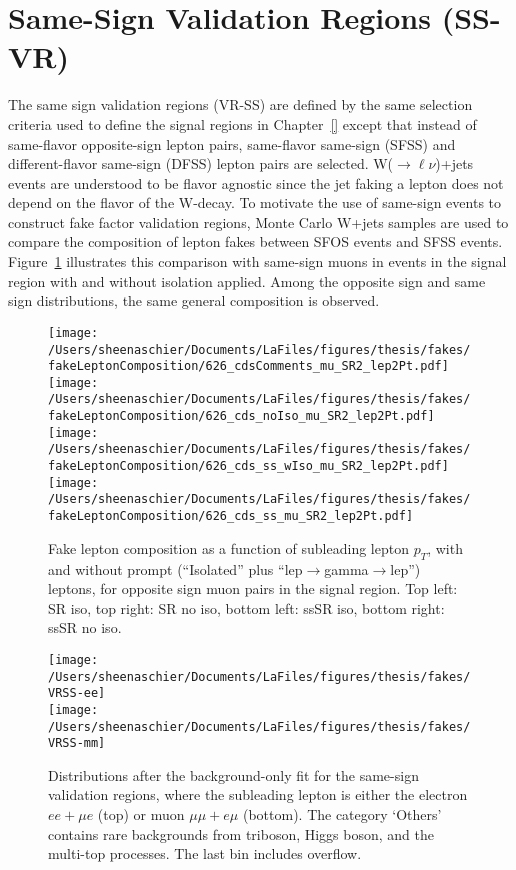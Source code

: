  \FloatBarrier

\section{Same-Sign Validation Regions (SS-VR)}
\label{sec:ssvr}
The same sign validation regions (VR-SS) are defined by the same selection criteria used to define the signal regions in Chapter~\ref{} except that instead of same-flavor opposite-sign lepton pairs, same-flavor same-sign (SFSS) and different-flavor same-sign (DFSS) lepton pairs are selected.  W($\rightarrow\ell\nu$)+jets events are understood to be flavor agnostic since the jet faking a lepton does not depend on the flavor of the W-decay.  To motivate the use of same-sign events to construct fake factor validation regions, Monte Carlo W+jets samples are used to compare the composition of lepton fakes between SFOS events and SFSS events.  Figure~\ref{fig:muMC} illustrates this comparison with same-sign muons in events in the signal region with and without isolation applied.  Among the opposite sign and same sign distributions, the same general composition is observed.  
\begin{figure}[htb]
        \centering
        \texttt{[image: /Users/sheenaschier/Documents/LaFiles/figures/thesis/fakes/fakeLeptonComposition/626\_cdsComments\_mu\_SR2\_lep2Pt.pdf]}
       \texttt{[image: /Users/sheenaschier/Documents/LaFiles/figures/thesis/fakes/fakeLeptonComposition/626\_cds\_noIso\_mu\_SR2\_lep2Pt.pdf]}
      \texttt{[image: /Users/sheenaschier/Documents/LaFiles/figures/thesis/fakes/fakeLeptonComposition/626\_cds\_ss\_wIso\_mu\_SR2\_lep2Pt.pdf]}
      \texttt{[image: /Users/sheenaschier/Documents/LaFiles/figures/thesis/fakes/fakeLeptonComposition/626\_cds\_ss\_mu\_SR2\_lep2Pt.pdf]}
        \caption{Fake lepton composition as a function of subleading lepton $p_{T}$, with and without prompt (``Isolated'' plus ``lep$\to$gamma$\to$lep'') leptons, for opposite sign muon pairs in the signal region.  Top left: SR iso, top right: SR no iso, bottom left: ssSR iso, bottom right: ssSR no iso.}
        \label{fig:muMC}
\end{figure}

\begin{figure}[htb]
        \centering
      \texttt{[image: /Users/sheenaschier/Documents/LaFiles/figures/thesis/fakes/VRSS-ee]}\\
      \texttt{[image: /Users/sheenaschier/Documents/LaFiles/figures/thesis/fakes/VRSS-mm]}
        \caption{Distributions after the background-only fit for the same-sign validation regions, where the subleading lepton is either the electron $ee+\mu e$ (top) or muon $\mu\mu+e\mu$ (bottom). The category `Others' contains rare backgrounds from triboson, Higgs boson, and the multi-top processes. The last bin includes overflow.}
        \label{fig:VRSS-el}
\end{figure}

